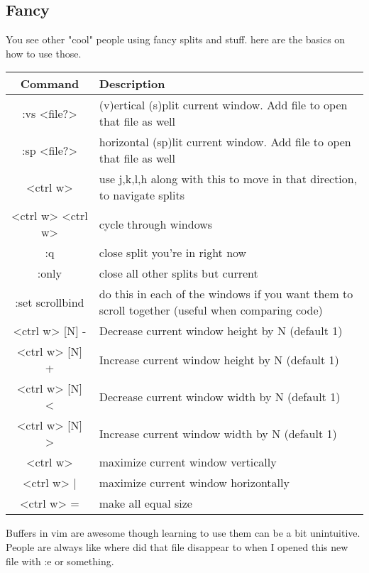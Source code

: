 \documentclass[12pt, letterpaper]{article}
\begin{document}
\subsection{Fancy}
You see other "cool" people using fancy splits and stuff. here are the basics
on how to use those.


\begin{table}[H]
    \begin{tabular}{|c|p{9cm}|}
        Command & Description \\
        \hline
        :vs <file?> & (v)ertical (s)plit current window. Add file to open that
        file as well \\
        \hline
        :sp <file?> & horizontal (sp)lit current window. Add file to open that
        file as well \\
        \hline
        <ctrl w> & use j,k,l,h along with this to move in that direction, to
        navigate splits \\
        \hline
        <ctrl w> <ctrl w> & cycle through windows \\
        \hline
        :q & close split you're in right now \\
        \hline
        :only & close all other splits but current \\
        \hline
        :set scrollbind & do this in each of the windows if you want them to
        scroll together (useful when comparing code) \\
        \hline
        <ctrl w> [N] - & Decrease current window height by N (default 1) \\
        \hline
        <ctrl w> [N] + & Increase current window height by N (default 1) \\
        \hline
        <ctrl w> [N] < & Decrease current window width by N (default 1) \\
        \hline
        <ctrl w> [N] > & Increase current window width by N (default 1) \\
        \hline
        <ctrl w> & maximize current window vertically \\
        \hline
        <ctrl w> | & maximize current window horizontally \\
        \hline
        <ctrl w> = & make all equal size \\
        \hline
    \end{tabular}
\end{table}


Buffers in vim are awesome though learning to use them can be a bit
unintuitive. People are always like where did that file disappear to when I
opened this new file with :e or something.
\end{document}
